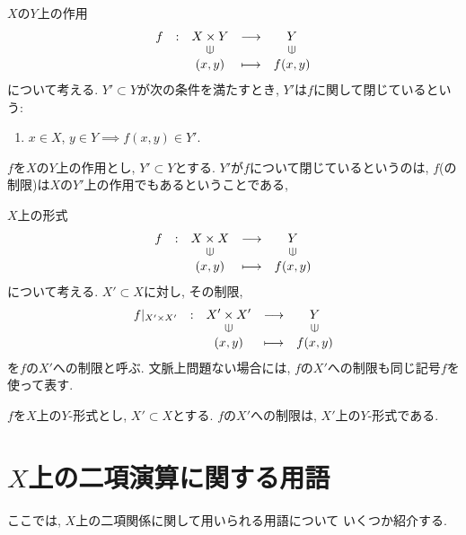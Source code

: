 \begin{definition}
  $X$の$Y$上の作用
  \begin{align*}
    \shazo{f}
          {X\times Y}{Y}
          {(x,y)}{f(x,y)}
  \end{align*}
  について考える.
  $Y'\subset Y$が次の条件を満たすとき,
  $Y'$は$f$に関して閉じているという:
  \begin{enumerate}
  \item $x\in X$, $y\in Y\implies f(x,y)\in Y'$.
  \end{enumerate}
\end{definition}
\begin{remark}
  $f$を$X$の$Y$上の作用とし,
  $Y'\subset Y$とする.
  $Y'$が$f$について閉じているというのは,
  $f$(の制限)は$X$の$Y'$上の作用でもあるということである,
\end{remark}


\begin{definition}
  $X$上の形式
  \begin{align*}
    \shazo{f}
          {X\times X}{Y}
          {(x,y)}{f(x,y)}
  \end{align*}
  について考える.
  $X'\subset X$に対し,
  その制限,
  \begin{align*}
    \shazo{f|_{X'\times X'}}
          {X'\times X'}{Y}
          {(x,y)}{f(x,y)}
  \end{align*}
  を$f$の$X'$への制限と呼ぶ.
  文脈上問題ない場合には,
  $f$の$X'$への制限も同じ記号$f$を使って表す.
\end{definition}
\begin{remark}
  $f$を$X$上の$Y$-形式とし,
  $X'\subset X$とする.
  $f$の$X'$への制限は,
  $X'$上の$Y$-形式である.
\end{remark}


\section{$X$上の二項演算に関する用語}
ここでは, $X$上の二項関係に関して用いられる用語について
いくつか紹介する.

